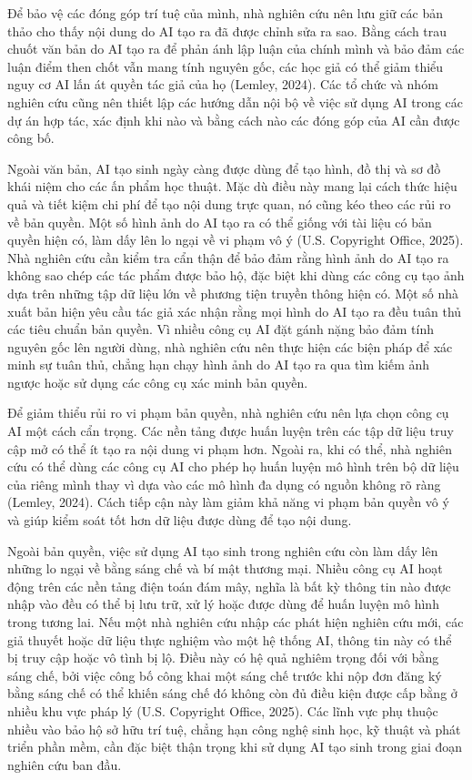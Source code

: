 Để bảo vệ các đóng góp trí tuệ của mình, nhà nghiên cứu nên lưu giữ các bản thảo cho thấy nội dung do AI tạo ra đã được chỉnh sửa ra sao. Bằng cách trau chuốt văn bản do AI tạo ra để phản ánh lập luận của chính mình và bảo đảm các luận điểm then chốt vẫn mang tính nguyên gốc, các học giả có thể giảm thiểu nguy cơ AI lấn át quyền tác giả của họ (Lemley, 2024). Các tổ chức và nhóm nghiên cứu cũng nên thiết lập các hướng dẫn nội bộ về việc sử dụng AI trong các dự án hợp tác, xác định khi nào và bằng cách nào các đóng góp của AI cần được công bố.

Ngoài văn bản, AI tạo sinh ngày càng được dùng để tạo hình, đồ thị và sơ đồ khái niệm cho các ấn phẩm học thuật. Mặc dù điều này mang lại cách thức hiệu quả và tiết kiệm chi phí để tạo nội dung trực quan, nó cũng kéo theo các rủi ro về bản quyền. Một số hình ảnh do AI tạo ra có thể giống với tài liệu có bản quyền hiện có, làm dấy lên lo ngại về vi phạm vô ý (U.S. Copyright Office, 2025). Nhà nghiên cứu cần kiểm tra cẩn thận để bảo đảm rằng hình ảnh do AI tạo ra không sao chép các tác phẩm được bảo hộ, đặc biệt khi dùng các công cụ tạo ảnh dựa trên những tập dữ liệu lớn về phương tiện truyền thông hiện có. Một số nhà xuất bản hiện yêu cầu tác giả xác nhận rằng mọi hình do AI tạo ra đều tuân thủ các tiêu chuẩn bản quyền. Vì nhiều công cụ AI đặt gánh nặng bảo đảm tính nguyên gốc lên người dùng, nhà nghiên cứu nên thực hiện các biện pháp để xác minh sự tuân thủ, chẳng hạn chạy hình ảnh do AI tạo ra qua tìm kiếm ảnh ngược hoặc sử dụng các công cụ xác minh bản quyền.

Để giảm thiểu rủi ro vi phạm bản quyền, nhà nghiên cứu nên lựa chọn công cụ AI một cách cẩn trọng. Các nền tảng được huấn luyện trên các tập dữ liệu truy cập mở có thể ít tạo ra nội dung vi phạm hơn. Ngoài ra, khi có thể, nhà nghiên cứu có thể dùng các công cụ AI cho phép họ huấn luyện mô hình trên bộ dữ liệu của riêng mình thay vì dựa vào các mô hình đa dụng có nguồn không rõ ràng (Lemley, 2024). Cách tiếp cận này làm giảm khả năng vi phạm bản quyền vô ý và giúp kiểm soát tốt hơn dữ liệu được dùng để tạo nội dung.

Ngoài bản quyền, việc sử dụng AI tạo sinh trong nghiên cứu còn làm dấy lên những lo ngại về bằng sáng chế và bí mật thương mại. Nhiều công cụ AI hoạt động trên các nền tảng điện toán đám mây, nghĩa là bất kỳ thông tin nào được nhập vào đều có thể bị lưu trữ, xử lý hoặc được dùng để huấn luyện mô hình trong tương lai. Nếu một nhà nghiên cứu nhập các phát hiện nghiên cứu mới, các giả thuyết hoặc dữ liệu thực nghiệm vào một hệ thống AI, thông tin này có thể bị truy cập hoặc vô tình bị lộ. Điều này có hệ quả nghiêm trọng đối với bằng sáng chế, bởi việc công bố công khai một sáng chế trước khi nộp đơn đăng ký bằng sáng chế có thể khiến sáng chế đó không còn đủ điều kiện được cấp bằng ở nhiều khu vực pháp lý (U.S. Copyright Office, 2025). Các lĩnh vực phụ thuộc nhiều vào bảo hộ sở hữu trí tuệ, chẳng hạn công nghệ sinh học, kỹ thuật và phát triển phần mềm, cần đặc biệt thận trọng khi sử dụng AI tạo sinh trong giai đoạn nghiên cứu ban đầu.

